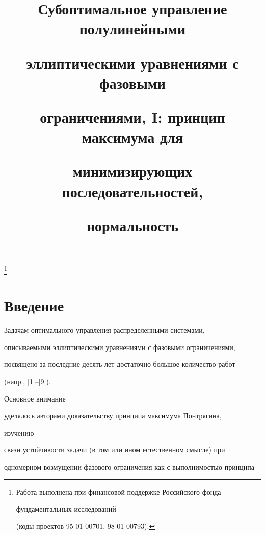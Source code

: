 

\title{Субоптимальное управление полулинейными  


эллиптическими уравнениями с фазовыми  


ограничениями, I: принцип максимума для 


минимизирующих последовательностей, 


нормальность} 


\thanks{Работа выполнена при финансовой поддержке Российского фонда 


фундаментальных исследований 


(коды проектов 95-01-00701, 98-01-00793).} 


 


\date{} 




\pagestyle{plain} %


 




\maketitle 


\label{begin} 


 


\section{Введение} 


 


Задачам оптимального управления распределенными системами, 


описываемыми эллиптическими уравнениями с фазовыми ограничениями, 


посвящено за последние десять лет достаточно большое количество работ


(напр., [1]--[9]).


Основное внимание 


уделялось авторами доказательству принципа максимума Понтрягина, 


изучению 


связи устойчивости задачи (в том или ином естественном смысле) при 


одномерном возмущении фазового ограничения как с выполнимостью принципа 


